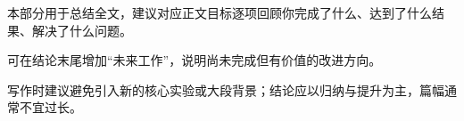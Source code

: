 \begin{conclusion}
本部分用于总结全文，建议对应正文目标逐项回顾你完成了什么、达到了什么结果、解决了什么问题。

可在结论末尾增加“未来工作”，说明尚未完成但有价值的改进方向。

写作时建议避免引入新的核心实验或大段背景；结论应以归纳与提升为主，篇幅通常不宜过长。
\end{conclusion}

